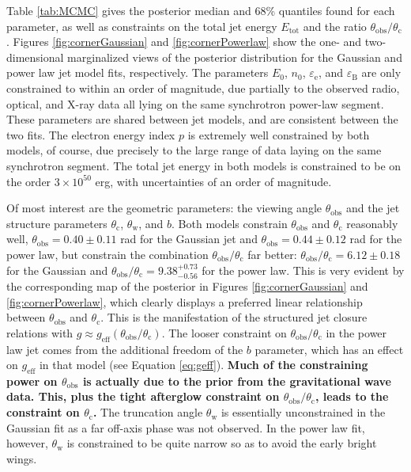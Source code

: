 \documentclass[twocolumn]{aastex62}
\newcommand{\thobs}{\ensuremath{\theta_{\mathrm{obs}}}}
\newcommand{\thW}{\ensuremath{\theta_{\mathrm{w}}}}
\newcommand{\thC}{\ensuremath{\theta_{\mathrm{c}}}}
\newcommand{\epse}{\ensuremath{\varepsilon_{\mathrm{e}}}}
\newcommand{\epsB}{\ensuremath{\varepsilon_{\mathrm{B}}}}
\newcommand{\Etot}{\ensuremath{E_{\mathrm{tot}}}}
\newcommand{\geff}{\ensuremath{g_{\mathrm{eff}}}}
\begin{document}
Table \ref{tab:MCMC} gives the posterior median and 68\% quantiles found for each parameter, as well as constraints on the total jet energy \Etot{} and the ratio $\thobs/\thC$. Figures \ref{fig:cornerGaussian} and \ref{fig:cornerPowerlaw} show the one- and two-dimensional marginalized views of the posterior distribution for the Gaussian and power law jet model fits, respectively.  The parameters $E_0$, $n_0$, $\epse$, and $\epsB$ are only constrained to within an order of magnitude, due partially to the observed radio, optical, and X-ray data all lying on the same synchrotron power-law segment.  These parameters are shared between jet models, and are consistent between the two fits.  The electron energy index $p$ is extremely well constrained by both models, of course, due precisely to the large range of data laying on the same synchrotron segment.  The total jet energy in both models is constrained to be on the order $3 \times 10^{50}$ erg, with uncertainties of an order of magnitude.

Of most interest are the geometric parameters: the viewing angle $\thobs$ and the jet structure parameters $\thC$, $\thW$, and $b$. Both models constrain $\thobs$ and $\thC$ reasonably well, $\thobs = 0.40 \pm 0.11$ rad for the Gaussian jet and $\thobs = 0.44 \pm 0.12$ rad for the power law, but constrain the combination $\thobs/\thC$ far better: $\thobs/\thC  = 6.12 \pm 0.18$ for the Gaussian and $\thobs/\thC  = 9.38^{+0.73}_{-0.56}$ for the power law. This is very evident by the corresponding map of the posterior in Figures \ref{fig:cornerGaussian} and \ref{fig:cornerPowerlaw}, which clearly displays a preferred linear relationship between $\thobs$ and $\thC$. This is the manifestation of the structured jet closure relations with $g \approx \geff(\thobs/\thC)$.  The looser constraint on $\thobs/\thC$ in the power law jet comes from the additional freedom of the $b$ parameter, which has an effect on $\geff$ in that model (see Equation \eqref{eq:geff}).  {\bf Much of the constraining power on $\thobs$ is actually due to the prior from the gravitational wave data.  This, plus the tight afterglow constraint on $ \thobs/\thC$, leads to the constraint on $\thC$. } The truncation angle $\thW$ is essentially unconstrained in the Gaussian fit as a far off-axis phase was not observed.  In the power law fit, however, $\thW$ is constrained to be quite narrow so as to avoid the early bright wings.  
\end{document}
